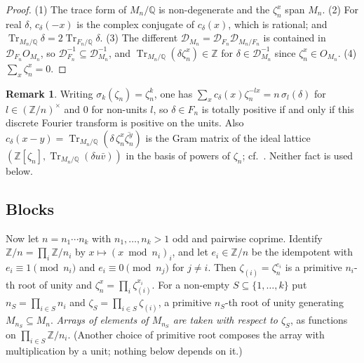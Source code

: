 \documentclass[11pt]{amsart}
\newcommand{\Q}{\mathbb{Q}}
\newcommand{\Z}{\mathbb{Z}}
\newcommand{\cod}[1]{\mathcal{D}_{#1}^{-1}}
\DeclareMathOperator{\Tr}{Tr}
\theoremstyle{plain}
\theoremstyle{definition}
\newtheorem{remark}[theorem]{Remark}
\begin{document}
\begin{proof}
(1) The trace form of $M_n/\Q$ is non-degenerate and the $\zeta_n^x$ span $M_n$.
(2) For real $\delta$, $c_\delta(-x)$ is the complex conjugate of $c_\delta(x)$, which is
rational; and $\Tr_{M_n/\Q}\delta = 2\Tr_{F_n/\Q}\delta$.
(3) The different $\mathcal{D}_{M_n} = \mathcal{D}_{F_n}\mathcal{D}_{M_n/F_n}$ is contained in
$\mathcal{D}_{F_n}O_{M_n}$, so $\cod{F_n} \subseteq \cod{M_n}$, and
$\Tr_{M_n/\Q}(\delta\zeta_n^x) \in \Z$ for $\delta \in \cod{M_n}$ since $\zeta_n^x \in O_{M_n}$.
(4) $\sum_x \zeta_n^x = 0$.
\end{proof}

\begin{remark}\label{rem:fourier}
Writing $\sigma_k(\zeta_n) = \zeta_n^k$, one has
$\sum_{x} c_\delta(x)\zeta_n^{-lx} = n\,\sigma_l(\delta)$ for $l \in (\Z/n)^\times$ and $0$ for
non-units $l$, so $\delta \in F_n$ is totally positive if and only if this discrete Fourier
transform is positive on the units. Also $c_\delta(x - y) = \Tr_{M_n/\Q}(\delta\,\zeta_n^x
\overline{\zeta_n^y})$ is the Gram matrix of the ideal lattice
$(\Z[\zeta_n], \Tr_{M_n/\Q}(\delta u \bar v))$ in the basis of powers of $\zeta_n$; cf.\ \cite[Lemma~1.5]{BF}. Neither fact is used below.
\end{remark}

\subsection*{Blocks} Now let $n = n_1 \cdots n_k$ with $n_1, \dots, n_k > 1$ odd and pairwise
coprime. Identify $\Z/n = \prod_i \Z/n_i$ by $x \mapsto (x \bmod n_i)_i$, and let $e_i \in \Z/n$
be the idempotent with $e_i \equiv 1 \pmod{n_i}$ and $e_i \equiv 0 \pmod{n_j}$ for $j \neq i$.
Then $\zeta_{(i)} = \zeta_n^{e_i}$ is a primitive $n_i$-th root of unity and
$\zeta_n^x = \prod_i \zeta_{(i)}^{x_i}$. For a non-empty $S \subseteq \{1, \dots, k\}$ put
$n_S = \prod_{i \in S} n_i$ and $\zeta_S = \prod_{i \in S}\zeta_{(i)}$, a primitive $n_S$-th root
of unity generating $M_{n_S} \subseteq M_n$. \emph{Arrays of elements of $M_{n_S}$ are taken with
respect to $\zeta_S$}, as functions on $\prod_{i \in S}\Z/n_i$. (Another choice of primitive root
composes the array with multiplication by a unit; nothing below depends on it.)
\end{document}
